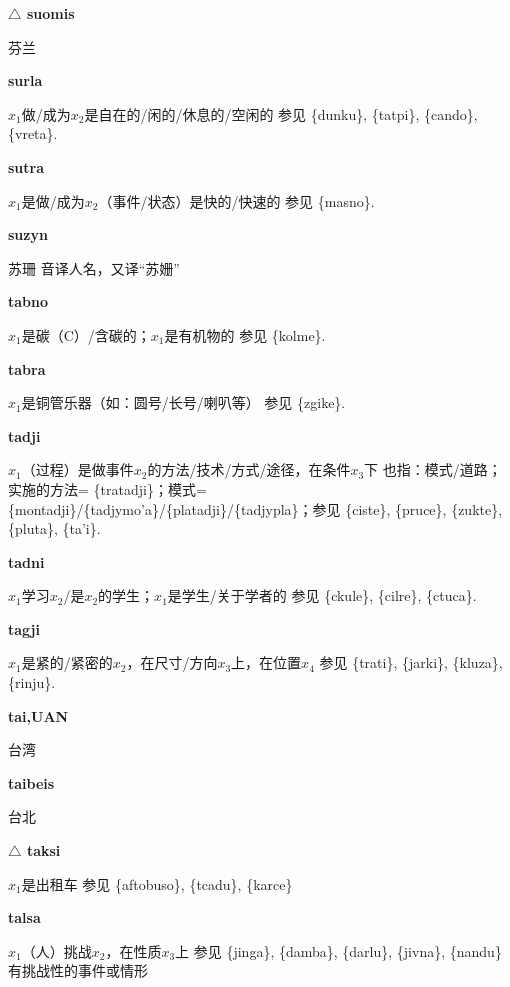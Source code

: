 \documentclass[notitlepage,twocolumn,a4paper,10pt]{book}
\begin{document}
{\sffamily\bfseries $\triangle$ suomis} 芬兰

{\sffamily\bfseries surla}\enspace {\ttfamily\bfseries[sur]}  $x_1$做\slash{}成为$x_2$是自在的\slash{}闲的\slash{}休息的\slash{}空闲的 \textemdash{} 参见 \{dunku\}, \{tatpi\}, \{cando\}, \{vreta\}.

{\sffamily\bfseries sutra}\enspace {\ttfamily\bfseries[sut]}  $x_1$是做\slash{}成为$x_2$（事件\slash{}状态）是快的\slash{}快速的 \textemdash{} 参见 \{masno\}.

{\sffamily\bfseries suzyn} 苏珊 \textemdash{} 音译人名，又译“苏姗”

{\sffamily\bfseries tabno}\enspace {\ttfamily\bfseries[tab]}  $x_1$是碳（C）\slash{}含碳的；$x_1$是有机物的 \textemdash{} 参见 \{kolme\}.

{\sffamily\bfseries tabra} $x_1$是铜管乐器（如：圆号\slash{}长号\slash{}喇叭等） \textemdash{} 参见 \{zgike\}.

{\sffamily\bfseries tadji} $x_1$（过程）是做事件$x_2$的方法\slash{}技术\slash{}方式\slash{}途径，在条件$x_3$下 \textemdash{} 也指：模式\slash{}道路； 实施的方法= \{tratadji\}；模式= \{montadji\}\slash{}\{tadjymo'a\}\slash{}\{platadji\}\slash{}\{tadjypla\}；参见 \{ciste\}, \{pruce\}, \{zukte\}, \{pluta\}, \{ta'i\}.

{\sffamily\bfseries tadni}\enspace {\ttfamily\bfseries[tad]}  $x_1$学习$x_2$\slash{}是$x_2$的学生；$x_1$是学生\slash{}关于学者的 \textemdash{} 参见 \{ckule\}, \{cilre\}, \{ctuca\}.

{\sffamily\bfseries tagji}\enspace {\ttfamily\bfseries[tag]}  $x_1$是紧的\slash{}紧密的$x_2$，在尺寸\slash{}方向$x_3$上，在位置$x_4$ \textemdash{} 参见 \{trati\}, \{jarki\}, \{kluza\}, \{rinju\}.

{\sffamily\bfseries tai,UAN} 台湾

{\sffamily\bfseries taibeis} 台北

{\sffamily\bfseries $\triangle$ taksi} $x_1$是出租车 \textemdash{} 参见 \{aftobuso\}, \{tcadu\}, \{karce\}

{\sffamily\bfseries talsa}\enspace {\ttfamily\bfseries[tal]}  $x_1$（人）挑战$x_2$，在性质$x_3$上 \textemdash{} 参见 \{jinga\}, \{damba\}, \{darlu\}, \{jivna\}, \{nandu\}有挑战性的事件或情形
\end{document}
